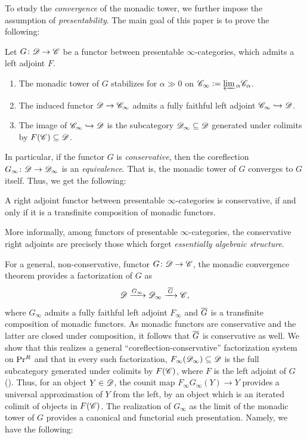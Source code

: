 \documentclass[12pt]{article}
\begin{document}
To study the \textit{convergence} of the monadic tower, we further impose the assumption of \textit{presentability}. The main goal of this paper is to prove the following:
\begin{thm*}
    Let $G\colon\mathscr{D} \to \mathscr{C}$ be a functor between presentable $\infty$-categories, which admits a left adjoint $F$.
    \begin{enumerate}
        \item The monadic tower of $G$ stabilizes for $\alpha\gg0$ on $\mathscr{C}_\infty := \underleftarrow{\operatorname{lim}\,}_\alpha \mathscr{C}_\alpha$.
        \item The induced functor 
            \(
                \mathscr{D} \to \mathscr{C}_\infty
            \)
            admits a fully faithful left adjoint $\mathscr{C}_\infty \hookrightarrow \mathscr{D}$.
        \item  The image of $\mathscr{C}_\infty \hookrightarrow \mathscr{D}$ is the subcategory $\mathscr{D}_\infty\subseteq \mathscr{D}$ generated under colimits by $F(\mathscr{C})\subseteq \mathscr{D}$. 
    \end{enumerate}
\end{thm*}

In particular, if the functor $G$ is \textit{conservative}, then the coreflection $G_\infty\colon\mathscr{D} \to \mathscr{D}_\infty$ is an \textit{equivalence}. That is, the monadic tower of $G$ converges to $G$ itself. Thus, we get the following:
\begin{corollary}
    A right adjoint functor between presentable $\infty$-categories is conservative, if and only if it is a transfinite composition of monadic functors.
\end{corollary}
More informally, among functors of presentable $\infty$-categories, the conservative right adjoints are precisely those which forget \textit{essentially algebraic structure}. 

For a general, non-conservative, functor $G\colon \mathscr{D} \to \mathscr{C}$, the monadic convergence theorem provides a factorization of $G$ as 
\[
    \mathscr{D} \xrightarrow{G_\infty} \mathscr{D}_\infty \xrightarrow{\:\overline{G}\:} \mathscr{C},
\]
where $G_\infty$ admits a fully faithful left adjoint $F_\infty$ and $\overline{G}$ is a transfinite composition of monadic functors. As monadic functors are conservative and the latter are closed under composition, it follows that $\overline{G}$ is conservative as well. We show that this realizes a general ``coreflection-conservative'' factorization system on $\mathrm{Pr}{}^R$ and that in every such factorization, $F_\infty(\mathscr{D}_\infty) \subseteq \mathscr{D}$ is the full subcategory generated under colimits by $F(\mathscr{C})$, where $F$ is the left adjoint of $G$ (). 
Thus, for an object $Y\in\mathscr{D}$, the counit map $F_\infty G_\infty (Y) \to Y$ provides a universal approximation of $Y$ from the left, by an object which is an iterated colimit of objects in $F(\mathscr{C})$. The realization of $G_\infty$ as the limit of the monadic tower of $G$ provides a canonical and functorial such presentation. Namely, we have the following:
\end{document}
